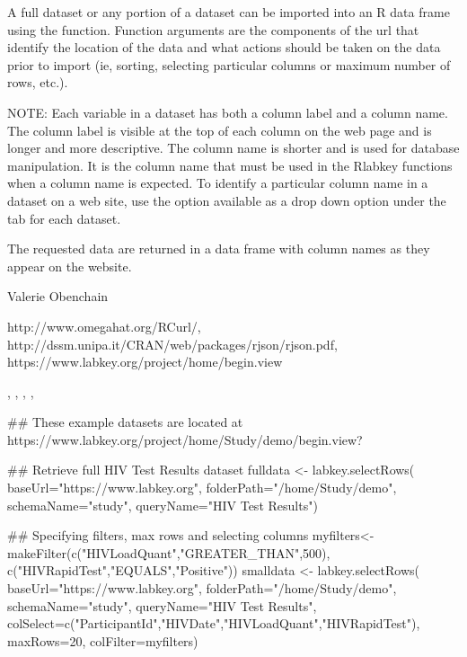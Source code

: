 \documentclass{book}
\begin{document}
\begin{Details}\relax
A full dataset or any portion of a dataset can be imported into an R data frame using the 
 function. Function arguments are the components of the url that identify
the location of the data and what actions should be taken on the data prior to import
(ie, sorting, selecting particular columns or maximum number of rows, etc.).

NOTE: Each variable in a dataset has both a column label and a column name. The column label is visible at the top
of each column on the web page and is longer and more descriptive. The column name is shorter and is
used  for database manipulation. It is the column name that must be used in
the Rlabkey functions when a column name is expected. To identify a particular column name in a dataset on
a web site, use the  option available as a drop down option under the 
tab for each dataset.
\end{Details}
\begin{Value}
The requested data are returned in a data frame with column names as they appear on the website.
\end{Value}
\begin{Author}\relax
Valerie Obenchain
\end{Author}
\begin{References}\relax
http://www.omegahat.org/RCurl/,\\ 
http://dssm.unipa.it/CRAN/web/packages/rjson/rjson.pdf,\\
https://www.labkey.org/project/home/begin.view
\end{References}
\begin{SeeAlso}\relax
{}, , , 
, 
\end{SeeAlso}
\begin{Examples}
\begin{ExampleCode}
## These example datasets are located at https://www.labkey.org/project/home/Study/demo/begin.view?

## Retrieve full HIV Test Results dataset
fulldata <- labkey.selectRows(  
baseUrl="https://www.labkey.org", 
folderPath="/home/Study/demo", 
schemaName="study", 
queryName="HIV Test Results")

## Specifying filters, max rows and selecting columns
myfilters<- makeFilter(c("HIVLoadQuant","GREATER_THAN",500), c("HIVRapidTest","EQUALS","Positive"))
smalldata <- labkey.selectRows( 
baseUrl="https://www.labkey.org", 
folderPath="/home/Study/demo", 
schemaName="study",     
queryName="HIV Test Results", 
colSelect=c("ParticipantId","HIVDate","HIVLoadQuant","HIVRapidTest"), 
maxRows=20,
colFilter=myfilters)


\end{ExampleCode}
\end{Examples}
\end{document}
